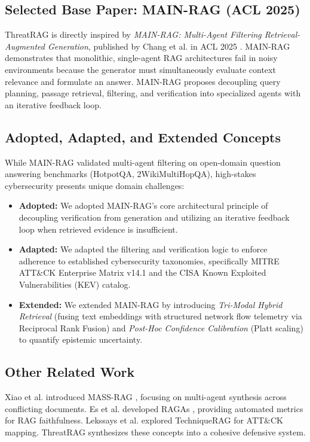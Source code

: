 \documentclass[conference]{IEEEtran}
\begin{document}
\subsection{Selected Base Paper: MAIN-RAG (ACL 2025)}
ThreatRAG is directly inspired by \textit{MAIN-RAG: Multi-Agent Filtering Retrieval-Augmented Generation}, published by Chang et al. in ACL 2025 \cite{chang2025mainrag}. MAIN-RAG demonstrates that monolithic, single-agent RAG architectures fail in noisy environments because the generator must simultaneously evaluate context relevance and formulate an answer. MAIN-RAG proposes decoupling query planning, passage retrieval, filtering, and verification into specialized agents with an iterative feedback loop.

\subsection{Adopted, Adapted, and Extended Concepts}
While MAIN-RAG validated multi-agent filtering on open-domain question answering benchmarks (HotpotQA, 2WikiMultiHopQA), high-stakes cybersecurity presents unique domain challenges:
\begin{itemize}
    \item \textbf{Adopted:} We adopted MAIN-RAG's core architectural principle of decoupling verification from generation and utilizing an iterative feedback loop when retrieved evidence is insufficient.
    \item \textbf{Adapted:} We adapted the filtering and verification logic to enforce adherence to established cybersecurity taxonomies, specifically MITRE ATT\&CK Enterprise Matrix v14.1 and the CISA Known Exploited Vulnerabilities (KEV) catalog.
    \item \textbf{Extended:} We extended MAIN-RAG by introducing \textit{Tri-Modal Hybrid Retrieval} (fusing text embeddings with structured network flow telemetry via Reciprocal Rank Fusion) and \textit{Post-Hoc Confidence Calibration} (Platt scaling) to quantify epistemic uncertainty.
\end{itemize}

\subsection{Other Related Work}
Xiao et al. introduced MASS-RAG \cite{xiao2026massrag}, focusing on multi-agent synthesis across conflicting documents. Es et al. developed RAGAs \cite{es2024ragas}, providing automated metrics for RAG faithfulness. Lekssays et al. explored TechniqueRAG \cite{lekssays2025techniquerag} for ATT\&CK mapping. ThreatRAG synthesizes these concepts into a cohesive defensive system.
\end{document}
